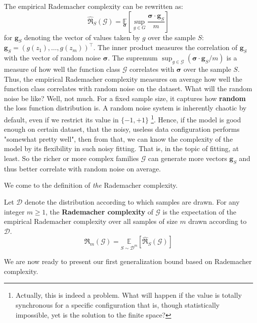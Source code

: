 The empirical Rademacher complexity can be rewritten as:
$$\hat{\mathfrak{R}}_S (\mathcal{G}) = \underset{\mathbf{\sigma}}{\mathbb{E}} \left[\sup_{g \in G} \frac{\bm{\sigma}\cdot \mathbf{g}_S}{m}\right]$$
for $\mathbf{g}_S$ denoting the vector of values taken by $g$ over the sample $S$: $\mathbf{g}_{S} = (g(z_1),\dots,g(z_{m}))^{\top}$. The inner product measures the correlation of $\mathbf{g}_{S}$ with the vector of random noise $\bm{\sigma}$. The supremum $\sup_{g\in \mathcal{G}} (\bm{\sigma}\cdot \mathbf{g}_{S}/m)$ is a measure of how well the function class $\mathcal{G}$ correlates with $\bm{\sigma}$ over the sample $S$. Thus, the empirical Rademacher complexity measures on average how well the function class correlates with random noise on the dataset. What will the random noise be like? Well, not much. For a fixed sample size, it captures how \textbf{random} the loss function distribution is. A random noise system is inherently chaotic by default, even if we restrict its value in $\{-1,+1\}$ \footnote{Actually, this is indeed a problem. What will happen if the value is totally synchronous for a specific configuration that is, though statistically impossible, yet is the solution to the finite space?}. Hence, if the model is good enough on certain dataset, that the noisy, useless data configuration performs "somewhat pretty well", then from that, we can know the complexity of the model by its flexibility in such noisy fitting. That is, in the topic of fitting, at least. So the richer or more complex families $\mathcal{G}$ can generate more vectors $\mathbf{g}_{S}$ and thus better correlate with random noise on average. 

We come to the definition of \textit{the} Rademacher complexity. 
\begin{definition}
    Let $\mathcal{D}$ denote the distribution according to which samples are drawn. For any integer $m\geq 1$, the \textbf{Rademacher complexity} of $\mathcal{G}$ is the expectation of the empirical Rademacher complexity over all samples of size $m$ drawn according to $\mathcal{D}$. 
    \begin{equation}
        \mathfrak{R}_{m} (\mathcal{G}) = \underset{S\sim \mathcal{D}^{m}}{\mathbb{E}} [\hat{\mathfrak{R}}_{S}(\mathcal{G})]
    \end{equation}
\end{definition}

We are now ready to present our first generalization bound based on Rademacher complexity. 

